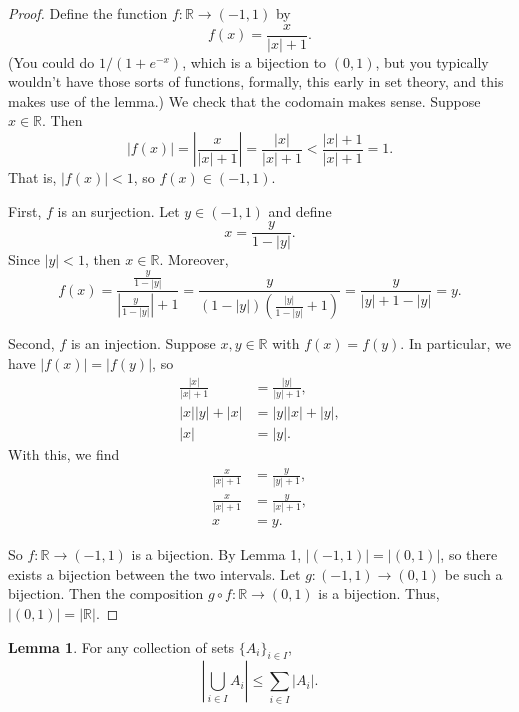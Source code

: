 \documentclass[12pt]{article}
\theoremstyle{definition}
\newtheorem{lemma}{Lemma}
\newcommand{\R}{\mathbb{R}}
\begin{document}
\begin{proof}
    Define the function $f : \R \to (-1, 1)$ by
    \[
        f(x) = \frac{x}{|x| + 1}.
    \]
    (You could do $1/(1 + e^{-x})$, which is a bijection to $(0, 1)$, but you typically wouldn't have those sorts of functions, formally, this early in set theory, and this makes use of the lemma.) We check that the codomain makes sense. Suppose $x \in \R$. Then
    \[
        |f(x)| = \left|\frac{x}{|x| + 1}\right| =\frac{|x|}{|x| + 1} < \frac{|x| + 1}{|x| + 1} = 1.
    \]
    That is, $|f(x)| < 1$, so $f(x) \in (-1, 1)$.
    
    First, $f$ is an surjection. Let $y \in (-1, 1)$ and define
    \[
        x = \frac{y}{1 - |y|}.
    \]
    Since $|y| < 1$, then $x \in \R$. Moreover,
    \[
        f(x)
            = \frac{\frac{y}{1 - |y|}}{\left|\frac{y}{1 - |y|}\right| + 1}
            = \frac{y}{(1 - |y|)\left(\frac{|y|}{1 - |y|} + 1\right)}
            = \frac{y}{|y| + 1 - |y|}
            = y.
    \]
    
    Second, $f$ is an injection. Suppose $x, y \in \R$ with $f(x) = f(y)$. In particular, we have $|f(x)| = |f(y)|$, so
    \begin{align*}
        \frac{|x|}{|x| + 1} &= \frac{|y|}{|y| + 1}, \\
        |x||y| + |x| &= |y||x| + |y|, \\
        |x| &= |y|.
    \end{align*}
    With this, we find
    \begin{align*}
        \frac{x}{|x| + 1} &= \frac{y}{|y| + 1}, \\
        \frac{x}{|x| + 1} &= \frac{y}{|x| + 1}, \\
        x &= y.
    \end{align*}
    
    So $f : \R \to (-1, 1)$ is a bijection. By Lemma 1, $|(-1,1)| = |(0,1)|$, so there exists a bijection between the two intervals. Let $g : (-1, 1) \to (0, 1)$ be such a bijection. Then the composition $g \circ f : \R \to (0, 1)$ is a bijection. Thus, $|(0, 1)| = |\R|$.
    
\end{proof}

\newpage
\begin{lemma}
    For any collection of sets $\{A_i\}_{i \in I}$,
    \[
        \left|\bigcup_{i \in I} A_i\right| \leq \sum_{i \in I} |A_i|.
    \]
\end{lemma}
\end{document}

